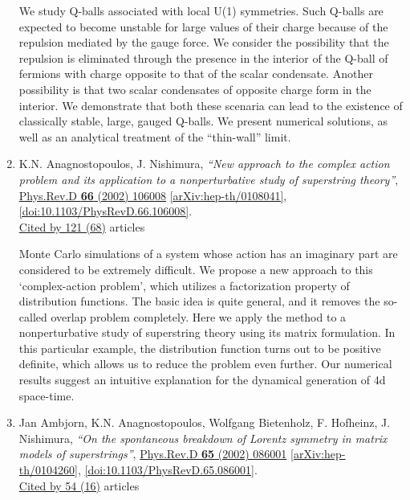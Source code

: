 \documentclass[a4paper,10pt]{article}
\begin{document}
\begin{enumerate}
We study Q-balls associated with local U(1) symmetries. Such Q-balls are expected to become unstable for large values of their charge because of the repulsion mediated by the gauge force. We consider the possibility that the repulsion is eliminated through the presence in the interior of the Q-ball of fermions with charge opposite to that of the scalar condensate. Another possibility is that two scalar condensates of opposite charge form in the interior. We demonstrate that both these scenaria can lead to the existence of classically stable, large, gauged Q-balls. We present numerical solutions, as well as an analytical treatment of the ``thin-wall'' limit.
\item K.N. Anagnostopoulos, J. Nishimura, {\it ``New approach to the complex action problem and its application to a nonperturbative study of superstring theory''}, \href{https://www.doi.org/10.1103/PhysRevD.66.106008}{Phys.Rev.D {\bf 66} (2002) 106008} \href{https://arxiv.org/abs/hep-th/0108041}{[arXiv:hep-th/0108041]}, \href{https://www.doi.org/10.1103/PhysRevD.66.106008}{[doi:10.1103/PhysRevD.66.106008]}.
\\\href{https://inspirehep.net/literature/?q=refersto%3Arecid%3A561215}{Cited by 121 (68)} articles

Monte Carlo simulations of a system whose action has an imaginary part are considered to be extremely difficult. We propose a new approach to this `complex-action problem', which utilizes a factorization property of distribution functions. The basic idea is quite general, and it removes the so-called overlap problem completely. Here we apply the method to a nonperturbative study of superstring theory using its matrix formulation. In this particular example, the distribution function turns out to be positive definite, which allows us to reduce the problem even further. Our numerical results suggest an intuitive explanation for the dynamical generation of 4d space-time.
\item Jan Ambjorn, K.N. Anagnostopoulos, Wolfgang Bietenholz, F. Hofheinz, J. Nishimura, {\it ``On the spontaneous breakdown of Lorentz symmetry in matrix models of superstrings''}, \href{https://www.doi.org/10.1103/PhysRevD.65.086001}{Phys.Rev.D {\bf 65} (2002) 086001} \href{https://arxiv.org/abs/hep-th/0104260}{[arXiv:hep-th/0104260]}, \href{https://www.doi.org/10.1103/PhysRevD.65.086001}{[doi:10.1103/PhysRevD.65.086001]}.
\\\href{https://inspirehep.net/literature/?q=refersto%3Arecid%3A556015}{Cited by 54 (16)} articles


\end{enumerate}
\end{document}
